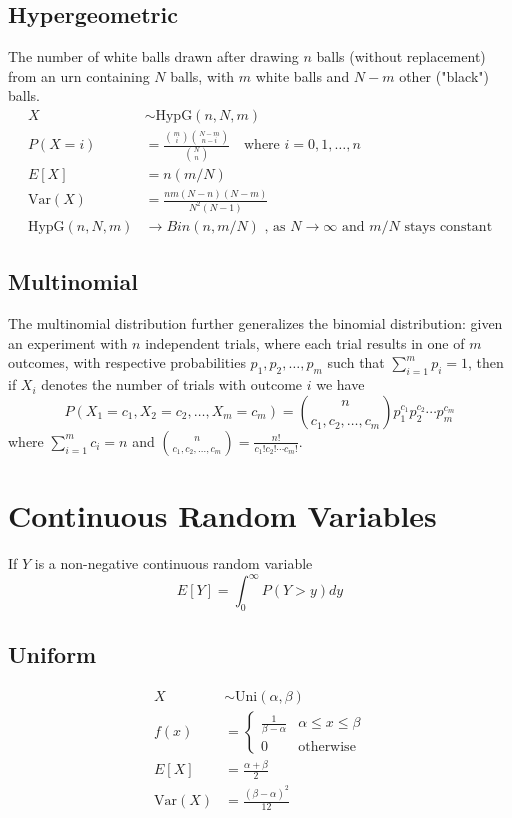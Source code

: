 \documentclass[12pt]{article}
\newcommand{\Sp}{\text{ }}
\newcommand{\Var}{\text{Var}}
\newcommand{\HypG}{\text{HypG}}
\newcommand{\Where}{\Sp\text{ where }}
\begin{document}
\subsection{Hypergeometric}
The number of white balls drawn after drawing $n$ balls (without replacement) from an urn containing $N$ balls, with $m$ white balls and $N-m$ other ("black") balls.
\begin{align*}
    X& \sim \HypG(n,N,m) \\
    P(X = i)& = \frac{\binom{m}{i} \binom{N-m}{n-i}}{\binom{N}{n}} \Where i = 0, 1, \ldots, n \\
        E[X]& = n(m/N) \\
     \Var(X)& = \frac{nm(N-n)(N-m)}{N^2(N-1)} \\
\HypG(n,N,m)& \rightarrow Bin(n, m/N) \text{ , as } N \rightarrow \infty \text{ and } m/N \text{ stays constant}
\end{align*}

\subsection{Multinomial}
The multinomial distribution further generalizes the binomial distribution: given an experiment with $n$ independent trials, where each trial results in one of $m$ outcomes, with respective probabilities $p_1, p_2, \ldots, p_m$ such that $\sum_{i=1}^{m} p_i = 1$, then if $X_i$ denotes the number of trials with outcome $i$ we have
$$P(X_1 = c_1, X_2 = c_2, \ldots, X_m = c_m) = \binom{n}{c_1, c_2, \ldots, c_m} p_1^{c_1} p_2^{c_2} \cdots p_m^{c_m}$$
where $\sum_{i=1}^{m} c_i = n$ and $\binom{n}{c_1, c_2, \ldots, c_m} = \frac{n!}{c_1! c_2! \cdots c_m!}$.

\section{Continuous Random Variables}
If $Y$ is a non-negative continuous random variable
$$E[Y] = \int_{0}^{\infty} P(Y > y) dy$$
\subsection{Uniform}
\begin{align*}
    X& \sim \text{Uni}(\alpha, \beta) \\
 f(x)& = \left\{
        \begin{array}{ll}
            \frac{1}{\beta - \alpha} & \alpha \leq x \leq \beta \\
                                   0 &\text{otherwise}
        \end{array}
    \right. \\
    E[X]& = \frac{\alpha + \beta}{2} \\
 \Var(X)& = \frac{(\beta - \alpha)^2}{12}
\end{align*}
\end{document}
